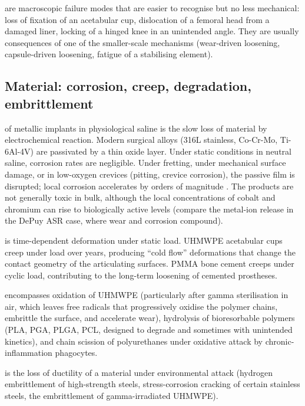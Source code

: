  are macroscopic failure
modes that are easier to recognise but no less mechanical:
loss of fixation of an acetabular cup, dislocation of a femoral
head from a damaged liner, locking of a hinged knee in an unintended
angle. They are usually consequences of one of the smaller-scale
mechanisms (wear-driven loosening, capsule-driven loosening,
fatigue of a stabilising element).

\subsection{Material: corrosion, creep, degradation, embrittlement}

 of metallic implants in physiological saline
is the slow loss of material by electrochemical reaction. Modern
surgical alloys (316L stainless, Co-Cr-Mo, Ti-6Al-4V) are
passivated by a thin oxide layer. Under static conditions in
neutral saline, corrosion rates are negligible. Under fretting,
under mechanical surface damage, or in low-oxygen crevices
(pitting, crevice corrosion), the passive film is disrupted; local
corrosion accelerates by orders of magnitude
\cite{paper:v6c12-broensted-corrosion-stainless-2017}. The
products are not generally toxic in bulk, although the local
concentrations of cobalt and chromium can rise to biologically
active levels (compare the metal-ion release in the DePuy ASR
case, where wear and corrosion compound).

 is time-dependent deformation under static load.
UHMWPE acetabular cups creep under load over years, producing
``cold flow'' deformations that change the contact geometry of the
articulating surfaces. PMMA bone cement creeps under cyclic load,
contributing to the long-term loosening of cemented prostheses.

 encompasses oxidation of UHMWPE
(particularly after gamma sterilisation in air, which leaves free
radicals that progressively oxidise the polymer chains, embrittle
the surface, and accelerate wear), hydrolysis of bioresorbable
polymers (PLA, PGA, PLGA, PCL, designed to degrade and sometimes
with unintended kinetics), and chain scission of polyurethanes
under oxidative attack by chronic-inflammation phagocytes.

 is the loss of ductility of a material
under environmental attack (hydrogen embrittlement of high-strength
steels, stress-corrosion cracking of certain stainless steels, the
embrittlement of gamma-irradiated UHMWPE).

